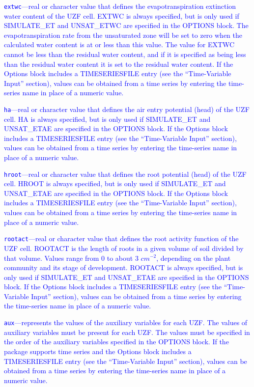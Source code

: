 \begin{description}
\item \textcolor{blue}{\texttt{extwc}---real or character value that defines the evapotranspiration extinction water content of the UZF cell. EXTWC is always specified, but is only used if SIMULATE\_ET and UNSAT\_ETWC are specified in the OPTIONS block. The evapotranspiration rate from the unsaturated zone will be set to zero when the calculated water content is at or less than this value.  The value for EXTWC cannot be less than the residual water content, and if it is specified as being less than the residual water content it is set to the residual water content. If the Options block includes a TIMESERIESFILE entry (see the ``Time-Variable Input'' section), values can be obtained from a time series by entering the time-series name in place of a numeric value.}

\item \textcolor{blue}{\texttt{ha}---real or character value that defines the air entry potential (head) of the UZF cell. HA is always specified, but is only used if SIMULATE\_ET and UNSAT\_ETAE are specified in the OPTIONS block. If the Options block includes a TIMESERIESFILE entry (see the ``Time-Variable Input'' section), values can be obtained from a time series by entering the time-series name in place of a numeric value.}

\item \textcolor{blue}{\texttt{hroot}---real or character value that defines the root potential (head) of the UZF cell. HROOT is always specified, but is only used if SIMULATE\_ET and UNSAT\_ETAE are specified in the OPTIONS block. If the Options block includes a TIMESERIESFILE entry (see the ``Time-Variable Input'' section), values can be obtained from a time series by entering the time-series name in place of a numeric value.}

\item \textcolor{blue}{\texttt{rootact}---real or character value that defines the root activity function of the UZF cell. ROOTACT is the length of roots in a given volume of soil divided by that volume. Values range from 0 to about 3 $cm^{-2}$, depending on the plant community and its stage of development. ROOTACT is always specified, but is only used if SIMULATE\_ET and UNSAT\_ETAE are specified in the OPTIONS block. If the Options block includes a TIMESERIESFILE entry (see the ``Time-Variable Input'' section), values can be obtained from a time series by entering the time-series name in place of a numeric value.}

\item \textcolor{blue}{\texttt{aux}---represents the values of the auxiliary variables for each UZF. The values of auxiliary variables must be present for each UZF. The values must be specified in the order of the auxiliary variables specified in the OPTIONS block.  If the package supports time series and the Options block includes a TIMESERIESFILE entry (see the ``Time-Variable Input'' section), values can be obtained from a time series by entering the time-series name in place of a numeric value.}

\end{description}

